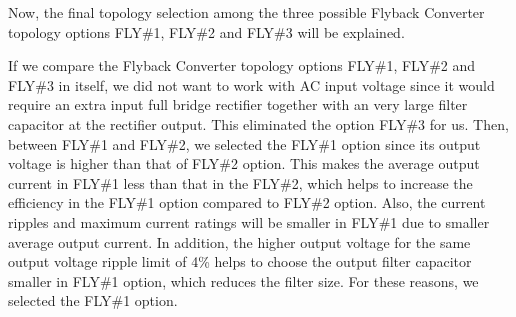 Now, the final topology selection among the three possible Flyback Converter topology options FLY\#1, FLY\#2 and FLY\#3 will be explained.

If we compare the Flyback Converter topology options FLY\#1, FLY\#2 and FLY\#3 in itself, we did not want to work with AC input voltage since it would require an extra input full bridge rectifier together with an very large filter capacitor at the rectifier output. This eliminated the option FLY\#3 for us. Then, between FLY\#1 and FLY\#2, we selected the FLY\#1 option since its output voltage is higher than that of FLY\#2 option. This makes the average output current in FLY\#1 less than that in the FLY\#2, which helps to increase the efficiency in the FLY\#1 option compared to FLY\#2 option. Also, the current ripples and maximum current ratings will be smaller in FLY\#1 due to smaller average output current. In addition, the higher output voltage for the same output voltage ripple limit of 4\% helps to choose the output filter capacitor smaller in FLY\#1 option, which reduces the filter size. For these reasons, we selected the FLY\#1 option.